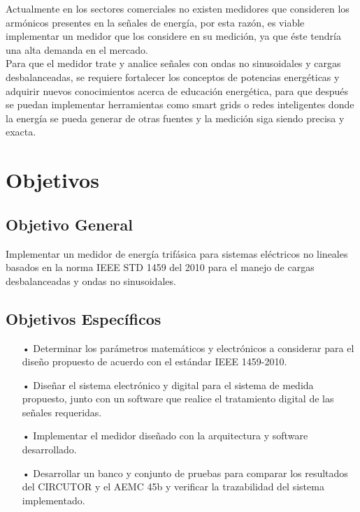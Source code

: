 Actualmente en los sectores comerciales no existen medidores que consideren los armónicos presentes en la señales de energía, por esta razón, es viable implementar un medidor que los considere en su medición, ya que éste tendría una alta demanda en el mercado. \\

Para que el medidor trate y analice señales con ondas no sinusoidales y cargas desbalanceadas, se requiere fortalecer los conceptos de potencias energéticas y adquirir nuevos conocimientos acerca de educación energética, para que después se puedan implementar herramientas como smart grids o redes inteligentes donde la energía se pueda generar de otras fuentes y la medición siga siendo precisa y exacta.


\newpage{\clearpage}
\chapter{Objetivos}
\section{Objetivo General}

Implementar un medidor de energía trifásica para sistemas eléctricos no lineales basados en la norma IEEE STD 1459 del 2010 para el manejo de cargas desbalanceadas y ondas no sinusoidales.

\section{Objetivos Específicos}
\begin{itemize} 
\item[•]Determinar los parámetros matemáticos y electrónicos a considerar para el diseño propuesto de acuerdo con el estándar IEEE 1459-2010. 

\item[•]	Diseñar el sistema electrónico y digital para el sistema de medida propuesto, junto con un software que realice el tratamiento digital de las señales requeridas.

\item[•] Implementar el medidor diseñado con la arquitectura y software desarrollado.

\item[•] Desarrollar un banco y conjunto de pruebas para comparar los resultados del CIRCUTOR y el AEMC 45b y verificar la trazabilidad del sistema implementado. 
 
\end{itemize}



